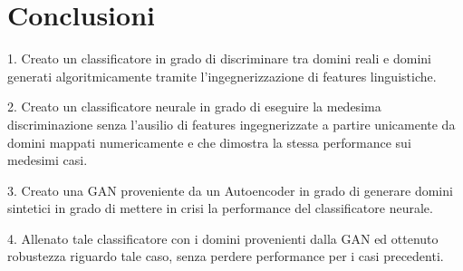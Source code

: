 \chapter{Conclusioni}
\label{conclusioni}

1. Creato un classificatore in grado di discriminare tra domini reali e domini generati algoritmicamente tramite l'ingegnerizzazione di features linguistiche.

2. Creato un classificatore neurale in grado di eseguire la medesima discriminazione senza l'ausilio di features ingegnerizzate a partire unicamente da domini mappati numericamente e che dimostra la stessa performance sui medesimi casi.

3. Creato una GAN proveniente da un Autoencoder in grado di generare domini sintetici in grado di mettere in crisi la performance del classificatore neurale.

4. Allenato tale classificatore con i domini provenienti dalla GAN ed ottenuto robustezza riguardo tale caso, senza perdere performance per i casi precedenti.